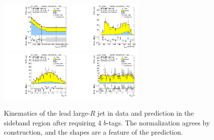 \begin{figure}[htbp!]
\begin{center}
\includegraphics[width=0.32\textwidth,angle=-90]{figures/boosted/Sideband/b77_FourTag_Sideband_leadHCand_Pt_m_1.pdf}
\includegraphics[width=0.32\textwidth,angle=-90]{figures/boosted/Sideband/b77_FourTag_Sideband_leadHCand_Mass_s.pdf}\\
\includegraphics[width=0.32\textwidth,angle=-90]{figures/boosted/Sideband/b77_FourTag_Sideband_leadHCand_Eta.pdf}
\includegraphics[width=0.32\textwidth,angle=-90]{figures/boosted/Sideband/b77_FourTag_Sideband_leadHCand_Phi.pdf}
  \caption{Kinematics of the lead large-$R$ jet in data and prediction in the sideband region after requiring 4 $b$-tags. The normalization agrees by construction, and the shapes are a feature of the prediction.}
  \label{fig:boosted-4b-sideband-ak10-lead}
\end{center}
\end{figure}

